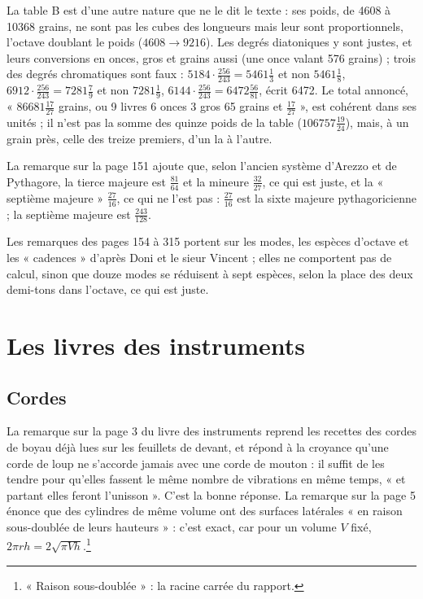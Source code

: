 \documentclass[11pt,a4paper]{article}
\begin{document}
La table B est d'une autre nature que ne le dit le texte : ses poids, de 4608 à
10368 grains, ne sont pas les cubes des longueurs mais leur sont
proportionnels, l'octave doublant le poids ($4608 \to 9216$). Les degrés
diatoniques y sont justes, et leurs conversions en onces, gros et grains aussi
(une once valant 576 grains) ; trois des degrés chromatiques sont faux :
$5184 \cdot \frac{256}{243} = 5461\frac13$ et non $5461\frac18$,
$6912 \cdot \frac{256}{243} = 7281\frac79$ et non $7281\frac19$,
$6144 \cdot \frac{256}{243} = 6472\frac{56}{81}$, écrit 6472. Le total
annoncé, « $86681\frac{17}{27}$ grains, ou 9 livres 6 onces 3 gros 65 grains et
$\frac{17}{27}$ », est cohérent dans ses unités ; il n'est pas la somme des
quinze poids de la table ($106757\frac{19}{24}$), mais, à un grain près, celle
des treize premiers, d'un la à l'autre.

La remarque sur la page 151 ajoute que, selon l'ancien système d'Arezzo et de
Pythagore, la tierce majeure est $\frac{81}{64}$ et la mineure $\frac{32}{27}$,
ce qui est juste, et la « septième majeure » $\frac{27}{16}$, ce qui ne l'est
pas : $\frac{27}{16}$ est la sixte majeure pythagoricienne ; la septième majeure
est $\frac{243}{128}$.

Les remarques des pages 154 à 315 portent sur les modes, les espèces
d'octave et les « cadences » d'après Doni et le sieur Vincent ; elles ne
comportent pas de calcul, sinon que douze modes se réduisent à sept espèces,
selon la place des deux demi-tons dans l'octave, ce qui est juste.

\section*{Les livres des instruments}

\subsection*{Cordes}

La remarque sur la page 3 du livre des instruments reprend les recettes des
cordes de boyau déjà lues sur les feuillets de devant, et répond à la croyance
qu'une corde de loup ne s'accorde jamais avec une corde de mouton : il suffit
de les tendre pour qu'elles fassent le même nombre de vibrations en même temps,
« et partant elles feront l'unisson ». C'est la bonne réponse. La remarque sur
la page 5 énonce que des cylindres de même volume ont des surfaces latérales
« en raison sous-doublée de leurs hauteurs » : c'est exact, car pour un volume
$V$ fixé, $2\pi r h = 2\sqrt{\pi V h}$.\footnote{« Raison sous-doublée » : la
racine carrée du rapport.}
\end{document}
